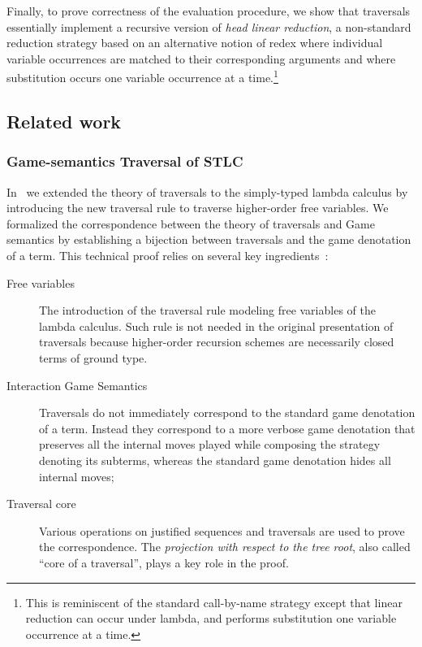 \documentclass{elsarticle}
\theoremstyle{plain}
\theoremstyle{definition}
\theoremstyle{remark}
\begin{document}
Finally, to prove correctness of the evaluation procedure, we show that traversals essentially implement a recursive version of \emph{head linear reduction}, a non-standard reduction strategy based on an alternative notion of redex where individual variable occurrences are matched to their corresponding arguments and where substitution occurs one variable occurrence at a time.\footnote{This is reminiscent of the standard call-by-name strategy except that linear reduction can occur under lambda, and performs substitution one variable occurrence at a time.}

\subsection{Related work}


\subsubsection{Game-semantics Traversal of STLC}

In~\cite{BlumPhd} we extended the theory of traversals to the simply-typed lambda calculus by introducing the new traversal rule  to traverse higher-order free variables. We formalized the correspondence between the theory of traversals and Game semantics by establishing a bijection between traversals and the game denotation of a term. This technical proof relies on several key ingredients~\cite{BlumPhd}:
\begin{description}
  \item[Free variables] The introduction of the traversal rule  modeling  free variables of the lambda calculus.
  Such rule is not needed in the original presentation of traversals because higher-order recursion schemes are necessarily closed terms of ground type\cite{Ong2006}.
  \item[Interaction Game Semantics] Traversals do not immediately correspond to the standard game denotation of a term. Instead they correspond to a more verbose game denotation that preserves all the internal moves played while composing the strategy denoting its subterms, whereas the standard game denotation hides all internal moves;
  \item[Traversal core] Various operations on justified sequences and traversals are used to prove the correspondence. The \emph{projection with respect to the tree root}, also called  ``core of a traversal'', plays a key role in the proof.
\end{description}
\end{document}
